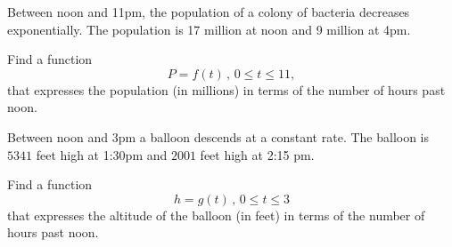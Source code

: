 \documentclass{ximera}
\begin{document}
\begin{question}  \label{Q87d6fgte}
Between noon and 11pm, the population of a colony of bacteria decreases exponentially. The population is 17 million at noon and 9 million at 4pm.

Find a function
\[
        P = f(t) \, , \, 0\leq t \leq 11 ,
\]
that expresses the population (in millions) in terms of the number of hours past noon.
\end{question}


\begin{question}  \label{Q98d33dg5r5r3}
Between noon and 3pm a balloon descends at a constant rate. The balloon is $5341$ feet high at 1:30pm and $2001$ feet high at 2:15 pm.

Find a function
\[
      h = g(t) \, , \, 0\leq t \leq 3
\]
that expresses the altitude of the balloon (in feet) in terms of the number of hours past noon.
\end{question}
\end{document}
